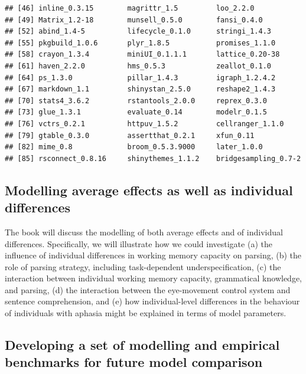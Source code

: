 \documentclass{cambridge7A}\usepackage[]{graphicx}\usepackage[]{color}
\makeatletter
\newenvironment{kframe}{%
 \def\at@end@of@kframe{}%
 \ifinner\ifhmode%
  \def\at@end@of@kframe{\end{minipage}}%
  \begin{minipage}{\columnwidth}%
 \fi\fi%
 \def\FrameCommand##1{\hskip\@totalleftmargin \hskip-\fboxsep
 \colorbox{shadecolor}{##1}\hskip-\fboxsep
     \hskip-\linewidth \hskip-\@totalleftmargin \hskip\columnwidth}%
 \MakeFramed {\advance\hsize-\width
   \@totalleftmargin\z@ \linewidth\hsize
   \@setminipage}}%
 {\par\unskip\endMakeFramed%
 \at@end@of@kframe}
\newenvironment{knitrout}{}{} %
\makeatother
\begin{document}
\begin{knitrout}
\begin{kframe}
\begin{verbatim}
## [46] inline_0.3.15        magrittr_1.5         loo_2.2.0           
## [49] Matrix_1.2-18        munsell_0.5.0        fansi_0.4.0         
## [52] abind_1.4-5          lifecycle_0.1.0      stringi_1.4.3       
## [55] pkgbuild_1.0.6       plyr_1.8.5           promises_1.1.0      
## [58] crayon_1.3.4         miniUI_0.1.1.1       lattice_0.20-38     
## [61] haven_2.2.0          hms_0.5.3            zeallot_0.1.0       
## [64] ps_1.3.0             pillar_1.4.3         igraph_1.2.4.2      
## [67] markdown_1.1         shinystan_2.5.0      reshape2_1.4.3      
## [70] stats4_3.6.2         rstantools_2.0.0     reprex_0.3.0        
## [73] glue_1.3.1           evaluate_0.14        modelr_0.1.5        
## [76] vctrs_0.2.1          httpuv_1.5.2         cellranger_1.1.0    
## [79] gtable_0.3.0         assertthat_0.2.1     xfun_0.11           
## [82] mime_0.8             broom_0.5.3.9000     later_1.0.0         
## [85] rsconnect_0.8.16     shinythemes_1.1.2    bridgesampling_0.7-2
\end{verbatim}
\end{kframe}
\end{knitrout}

\subsection{Modelling average effects as well as individual differences}

The book will discuss the modelling of both average effects and of individual differences. Specifically, we will illustrate how we could investigate (a) 
the influence of individual differences in  working memory capacity on parsing, (b) the role of parsing strategy, including task-dependent underspecification,  (c) the interaction between individual working memory capacity, grammatical knowledge, and parsing, (d) the interaction between the eye-movement control system and sentence comprehension, and (e) how individual-level differences in the behaviour of individuals with aphasia might be explained in terms of model parameters. 

\subsection{Developing a set of modelling and empirical benchmarks for future model comparison}
\end{document}
